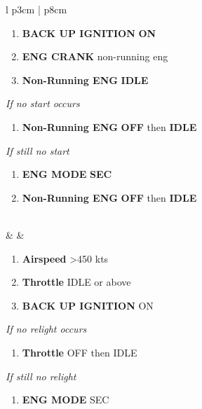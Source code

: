 \documentclass[10pt,usenames,dvipsnames,twoside]{report}
\begin{document}
\begin{center}
\begin{longtable}{l p{3cm} | p{8cm}}
\begin{minipage}[t]{\linewidth}
\begin{enumerate}
					\item \textbf{BACK UP IGNITION} \dotfill \textbf{ON}
					\item \textbf{ENG CRANK} \dotfill non-running eng
					\item \textbf{Non-Running ENG} \dotfill \textbf{IDLE}
				\end{enumerate}
				\vspace{-7pt}
				\emph{If no start occurs}
				\begin{enumerate}[label=(\alph*), resume]
					\vspace{-7pt}
					\item \textbf{Non-Running ENG} \dotfill \textbf{OFF} then \textbf{IDLE}
				\end{enumerate}
				\vspace{-7pt}
				\emph{If still no start}
				\begin{enumerate}[label=(\alph*), resume]
					\vspace{-7pt}
					\item \textbf{ENG MODE} \dotfill \textbf{SEC}
					\item \textbf{Non-Running ENG} \dotfill \textbf{OFF} then \textbf{IDLE}
				\end{enumerate}
			\end{minipage} \\
			\midrule
			\textbullet &  &
			\begin{minipage}[t]{\linewidth}
				\vspace{-7pt}
				\begin{enumerate}
					\item \textbf{Airspeed} \dotfill >450 kts
					\item \textbf{Throttle} \dotfill IDLE or above
					\item \textbf{BACK UP IGNITION} \dotfill ON
				\end{enumerate}
				\vspace{-7pt}
				\emph{If no relight occurs}
				\begin{enumerate}[label=(\alph*), resume]
					\vspace{-7pt}
					\item \textbf{Throttle} \dotfill OFF then IDLE
				\end{enumerate}
				\vspace{-7pt}
				\emph{If still no relight}
				\begin{enumerate}[label=(\alph*), resume]
					\vspace{-7pt}
					\item \textbf{ENG MODE} \dotfill SEC

\end{enumerate}
\end{minipage}
\end{longtable}
\end{center}
\end{document}
